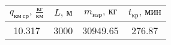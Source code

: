 \begin{tabular}{|c|c|c|c|}
\hline
$q_{км\, ср},\, \frac{кг}{км}$ & $L,\, м$ & $m_{изр},\, кг$ & $t_{кр},\, мин$ \\ 
\hline
10.317 & 3000 & 30949.65 & 276.87 \\ 
\hline
\end{tabular}